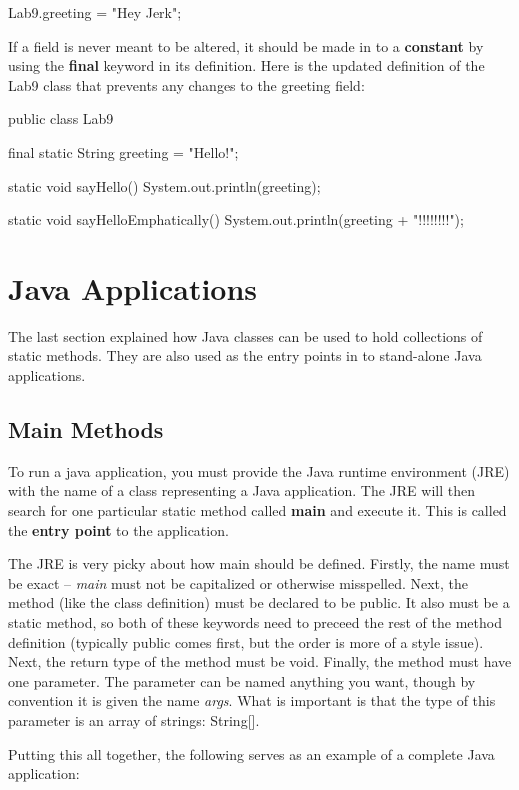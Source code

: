 \begin{code}
Lab9.greeting = "Hey Jerk";
\end{code}

If a field is never meant to be altered, it should be made in to a \textbf{constant} by using the \textbf{final} keyword in its definition. Here is the updated definition of the Lab9 class that prevents any changes to the greeting field:


\begin{code}
public class Lab9 {
  final static String greeting = "Hello!";

  static void sayHello() {
    System.out.println(greeting);
  }

  static void sayHelloEmphatically() {
    System.out.println(greeting + "!!!!!!!!");
  }
}
\end{code}

\section{Java Applications}
The last section explained how Java classes can be used to hold collections of static methods. They are also used as the entry points in to stand-alone Java applications. 

\subsection{Main Methods}
To run a java application, you must provide the Java runtime environment (JRE) with the name of a class representing a Java application. The JRE will then search for one particular static method called \textbf{main} and execute it. This is called the \textbf{entry point} to the application. 

The JRE is very picky about how main should be defined. Firstly, the name must be exact -- \textit{main} must not be capitalized or otherwise misspelled. Next, the method (like the class definition) must be declared to be public. It also must be a static method, so both of these keywords need to preceed the rest of the method definition (typically public comes first, but the order is more of a style issue). Next, the return type of the method must be void. Finally, the method must have one parameter. The parameter can be named anything you want, though by convention it is given the name \textit{args}. What is important is that the type of this parameter is an array of strings:  String[].  

Putting this all together, the following serves as an example of a complete Java application:

